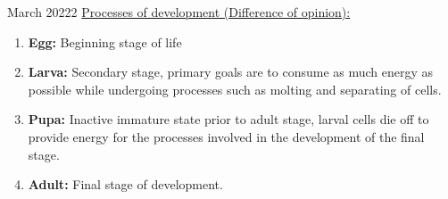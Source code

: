 \documentclass[12pt,oneside]{book} %
\begin{document}
\begin{lec}{March 20222}
  \underline{Processes of development (Difference of opinion):}
  \begin{enumerate}
    \item \textbf{Egg:} Beginning stage of life 
    \item \textbf{Larva:} Secondary stage, primary goals are to consume as much energy as possible while undergoing processes
    such as molting and separating of cells.
    \item \textbf{Pupa:} Inactive immature state prior to adult stage, larval cells die off to provide energy for the
    processes involved in the development of the final stage.
    \item \textbf{Adult:} Final stage of development.
  \end{enumerate}
  


  


  



  

  

  





  




















	\end{lec}
\end{document}
